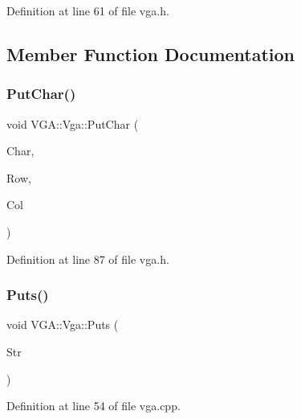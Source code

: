 Definition at line 61 of file vga.\+h.



\subsection{Member Function Documentation}
\mbox{\label{class_v_g_a_1_1_vga_a29fa008c7c3c71535e0502063451bea7}} 
\subsubsection{\texorpdfstring{Put\+Char()}{PutChar()}}
{\footnotesize\ttfamily void V\+G\+A\+::\+Vga\+::\+Put\+Char (\begin{DoxyParamCaption}\item[{\hyperlink{namespace_v_g_a_adb876ce4a116e09f39708ca16ef25f74}{Vga\+Char}}]{Char,  }\item[{size\+\_\+t}]{Row,  }\item[{size\+\_\+t}]{Col }\end{DoxyParamCaption})\hspace{0.3cm}{\ttfamily [inline]}}



Definition at line 87 of file vga.\+h.

\mbox{\label{class_v_g_a_1_1_vga_ad9977be41b05972a0366f8448b669a71}} 
\subsubsection{\texorpdfstring{Puts()}{Puts()}}
{\footnotesize\ttfamily void V\+G\+A\+::\+Vga\+::\+Puts (\begin{DoxyParamCaption}\item[{const char $\ast$}]{Str }\end{DoxyParamCaption})}



Definition at line 54 of file vga.\+cpp.

\mbox{\label{class_v_g_a_1_1_vga_af865dcb8b0e73497fa242601619f5570}} 
